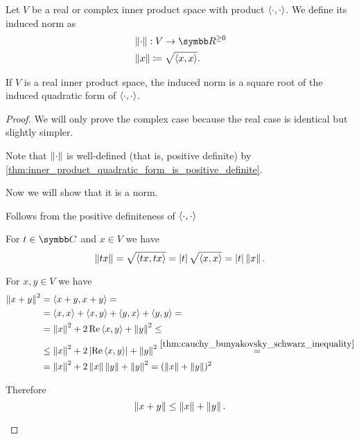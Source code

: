\begin{definition}\label{def:bilinear_form_induced_norm}
  Let \( V \) be a real or complex inner product space with product \( \left\langle \cdot, \cdot \right\rangle \). We define its induced norm as
  \begin{align*}
    &\Norm \cdot : V \to \R^{\geq 0} \\
    &\Norm x \coloneqq \sqrt{\Prod x x}.
  \end{align*}

  If \( V \) is a real inner product space, the induced norm is a square root of the induced quadratic form of \( \left\langle \cdot, \cdot \right\rangle \).
\end{definition}
\begin{proof}
  We will only prove the complex case because the real case is identical but slightly simpler.

  Note that \( \left\Vert \cdot \right\Vert \) is well-defined (that is, positive definite) by \cref{thm:inner_product_quadratic_form_is_positive_definite}.

  Now we will show that it is a norm.
  \begin{description}
     Follows from the positive definiteness of \( \left\langle \cdot, \cdot \right\rangle \)

     For \( t \in \BB{C} \) and \( x \in V \) we have
    \begin{equation*}
      \left\Vert tx \right\Vert = \sqrt{\left\langle tx, tx \right\rangle} = \left\vert t \right\vert \sqrt{\left\langle x, x \right\rangle} = \left\vert t \right\vert \left\Vert x \right\Vert.
    \end{equation*}

     For \( x, y \in V \) we have
    \begin{align*}
      \left\Vert x + y \right\Vert^2
      &=
      \left\langle x + y, x + y \right\rangle
      = \\ &=
      \left\langle x, x \right\rangle + \left\langle x, y \right\rangle + \left\langle y, x \right\rangle + \left\langle y, y \right\rangle
      = \\ &=
      \left\Vert x \right\Vert^2 + 2 \operatorname{Re} \left\langle x, y \right\rangle + \left\Vert y \right\Vert^2
      \leq \\ &\leq
      \left\Vert x \right\Vert^2 + 2 \left\vert \operatorname{Re} \left\langle x, y \right\rangle \right\vert + \left\Vert y \right\Vert^2
      \overset {\ref{thm:cauchy_bunyakovsky_schwarz_inequality}} = \\ &=
      \left\Vert x \right\Vert^2 + 2 \left\Vert x \right\Vert \left\Vert y \right\Vert + \left\Vert y \right\Vert^2
      =
      (\left\Vert x \right\Vert + \left\Vert y \right\Vert)^2
    \end{align*}

    Therefore
    \begin{equation*}
      \left\Vert x + y \right\Vert \leq \left\Vert x \right\Vert + \left\Vert y \right\Vert.
    \end{equation*}
  \end{description}
\end{proof}
